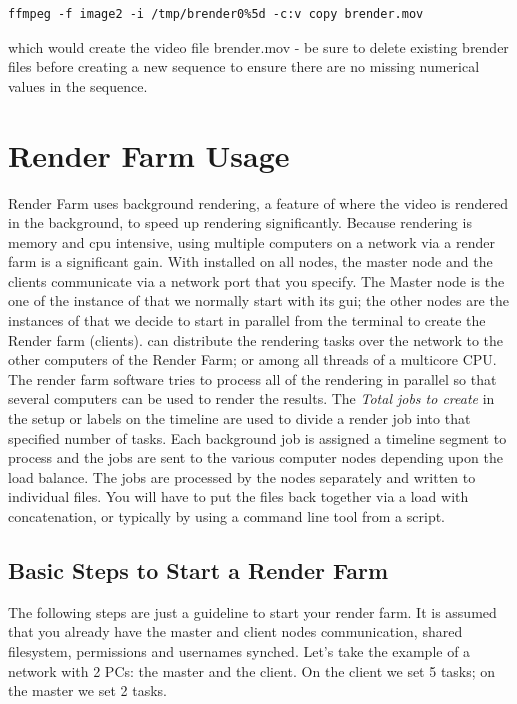 \begin{lstlisting}[style=sh]
ffmpeg -f image2 -i /tmp/brender0%5d -c:v copy brender.mov
\end{lstlisting}
which would create the video file brender.mov -  be sure to delete
existing brender files before creating a new sequence to ensure there
are no missing numerical values in the sequence.

\section{Render Farm Usage}%
\label{sec:render_farm_usage}

Render Farm uses background rendering, a feature of \CGG{} where the
video is rendered in the background, to speed up rendering
significantly.  Because rendering is memory and cpu intensive, using
multiple computers on a network via a render farm is a significant
gain. With \CGG{} installed on all nodes, the master node and the clients communicate via a network port that you specify.
The Master node is the one of the instance of \CGG{} that we normally start with its gui; the other nodes are the instances of \CGG{} that we decide to start in parallel from the terminal to create the Render farm (clients).
\CGG{} can distribute the rendering tasks over the network to the
other computers of the Render Farm; or among all threads of a multicore CPU.  The render farm software tries
to process all of the rendering in parallel so that several
computers can be used to render the results.  The \textit{Total jobs
to create} in the setup or labels on the timeline are used to divide
a render job into that specified number of tasks.  Each background
job is assigned a timeline segment to process and the jobs are sent
to the various computer nodes depending upon the load balance.  The
jobs are processed by the nodes separately and written to individual
files.  You will have to put the files back together via a load with
concatenation, or typically by using a command line tool from a
script.

\subsection{Basic Steps to Start a Render Farm}%
\label{sub:basic_steps_start_render_farm}

The following steps are just a guideline to start your render farm.
It is assumed that you already have the master and client nodes
communication, shared filesystem, permissions and usernames synched.
Let's take the example of a network with 2 PCs: the master and the client. On the client we set 5 tasks; on the master we set 2 tasks.

